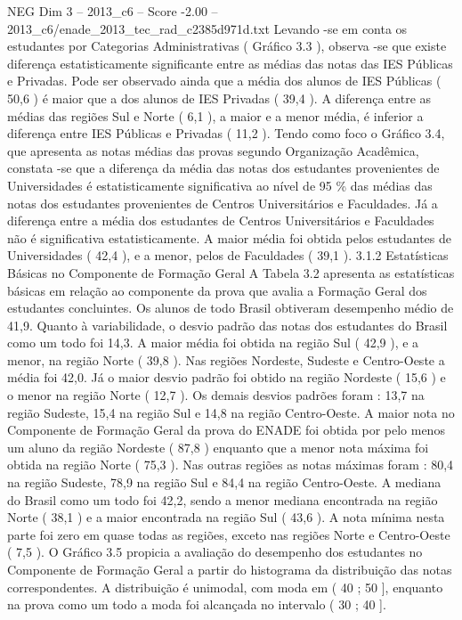 \begin{textsample}{NEG Dim 3 – 2013\_c6 – Score -2.00 – 2013\_c6/enade\_2013\_tec\_rad\_c2385d971d.txt}
Levando -se em conta os estudantes por Categorias Administrativas ( Gráfico 3.3 ), observa -se que existe diferença estatisticamente significante entre as médias das notas das IES Públicas e Privadas.
Pode ser observado ainda que a média dos alunos de IES Públicas ( 50,6 ) é maior que a dos alunos de IES Privadas ( 39,4 ).
A diferença entre as médias das regiões Sul e Norte ( 6,1 ), a maior e a menor média, é inferior a diferença entre IES Públicas e Privadas ( 11,2 ).
Tendo como foco o Gráfico 3.4, que apresenta as notas médias das provas segundo Organização Acadêmica, constata -se que a diferença da média das notas dos estudantes provenientes de Universidades é estatisticamente significativa ao nível de 95 \% das médias das notas dos estudantes provenientes de Centros Universitários e Faculdades.
Já a diferença entre a média dos estudantes de Centros Universitários e Faculdades não é significativa estatisticamente.
A maior média foi obtida pelos estudantes de Universidades ( 42,4 ), e a menor, pelos de Faculdades ( 39,1 ). 3.1.2 Estatísticas Básicas no Componente de Formação Geral A Tabela 3.2 apresenta as estatísticas básicas em relação ao componente da prova que avalia a Formação Geral dos estudantes concluintes.
Os alunos de todo Brasil obtiveram desempenho médio de 41,9.
Quanto à variabilidade, o desvio padrão das notas dos estudantes do Brasil como um todo foi 14,3.
A maior média foi obtida na região Sul ( 42,9 ), e a menor, na região Norte ( 39,8 ).
Nas regiões Nordeste, Sudeste e Centro-Oeste a média foi 42,0.
Já o maior desvio padrão foi obtido na região Nordeste ( 15,6 ) e o menor na região Norte ( 12,7 ).
Os demais desvios padrões foram : 13,7 na região Sudeste, 15,4 na região Sul e 14,8 na região Centro-Oeste.
A maior nota no Componente de Formação Geral da prova do ENADE foi obtida por pelo menos um aluno da região Nordeste ( 87,8 ) enquanto que a menor nota máxima foi obtida na região Norte ( 75,3 ).
Nas outras regiões as notas máximas foram : 80,4 na região Sudeste, 78,9 na região Sul e 84,4 na região Centro-Oeste.
A mediana do Brasil como um todo foi 42,2, sendo a menor mediana encontrada na região Norte ( 38,1 ) e a maior encontrada na região Sul ( 43,6 ).
A nota mínima nesta parte foi zero em quase todas as regiões, exceto nas regiões Norte e Centro-Oeste ( 7,5 ).
O Gráfico 3.5 propicia a avaliação do desempenho dos estudantes no Componente de Formação Geral a partir do histograma da distribuição das notas correspondentes.
A distribuição é unimodal, com moda em ( 40 ; 50 ], enquanto na prova como um todo a moda foi alcançada no intervalo ( 30 ; 40 ].

\end{textsample}
